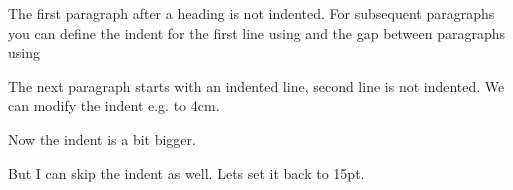 \setlength{\parskip}{1cm plus4mm minus3mm}The first paragraph after a heading is not indented. For subsequent paragraphs you can define the indent for the first line using  and the gap between paragraphs using 

The next paragraph starts with an indented line, second line is not indented. We can modify the indent e.g. to 4cm. \setlength{\parindent}{4cm} 

Now the indent is a bit bigger. 

\noindent {}But I can skip the indent as well. Lets set it back to 15pt. \setlength{\parindent}{15pt}
